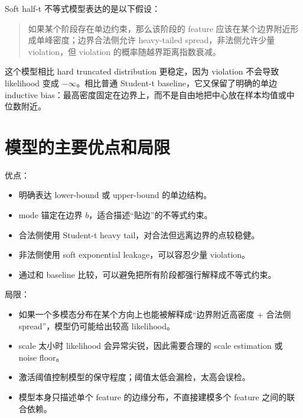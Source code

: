 \documentclass[11pt]{ctexart}
\begin{document}
Soft half-t 不等式模型表达的是以下假设：

\begin{quote}
如果某个阶段存在单边约束，那么该阶段的 feature 应该在某个边界附近形成单峰密度；边界合法侧允许 heavy-tailed spread，非法侧允许少量 violation，但 violation 的概率随越界距离指数衰减。
\end{quote}

这个模型相比 hard truncated distribution 更稳定，因为 violation 不会导致 likelihood 变成 $-\infty$。相比普通 Student-t baseline，它又保留了明确的单边 inductive bias：最高密度固定在边界上，而不是自由地把中心放在样本均值或中位数附近。

\section{模型的主要优点和局限}

优点：
\begin{itemize}[leftmargin=2em]
  \item 明确表达 lower-bound 或 upper-bound 的单边结构。
  \item mode 锚定在边界 $b$，适合描述“贴边”的不等式约束。
  \item 合法侧使用 Student-t heavy tail，对合法但远离边界的点较稳健。
  \item 非法侧使用 soft exponential leakage，可以容忍少量 violation。
  \item 通过和 baseline 比较，可以避免把所有阶段都强行解释成不等式约束。
\end{itemize}

局限：
\begin{itemize}[leftmargin=2em]
  \item 如果一个多模态分布在某个方向上也能被解释成“边界附近高密度 + 合法侧 spread”，模型仍可能给出较高 likelihood。
  \item scale 太小时 likelihood 会异常尖锐，因此需要合理的 scale estimation 或 noise floor。
  \item 激活阈值控制模型的保守程度；阈值太低会漏检，太高会误检。
  \item 模型本身只描述单个 feature 的边缘分布，不直接建模多个 feature 之间的联合依赖。
\end{itemize}
\end{document}
